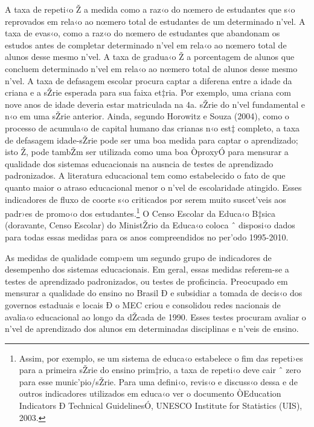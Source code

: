 \documentclass[a4paper, 12pt]{article}
\begin{document}
A taxa de repeti‹o Ž a medida como a raz‹o do nœmero de estudantes que s‹o reprovados em rela‹o ao nœmero total de estudantes de um determinado n’vel. A taxa de evas‹o, como a raz‹o do nœmero de estudantes que abandonam os estudos antes de completar determinado n’vel em rela‹o ao nœmero total de alunos desse mesmo n’vel. A taxa de gradua‹o Ž a porcentagem de alunos que concluem determinado n’vel em rela‹o ao nœmero total de alunos desse mesmo n’vel. A taxa de defasagem escolar procura captar a diferena entre a idade da criana e a sŽrie esperada para sua faixa et‡ria. Por exemplo, uma criana com nove anos de idade deveria estar matriculada na 4a. sŽrie do n’vel fundamental e n‹o em uma sŽrie anterior. Ainda, segundo Horowitz e Souza (2004), como o processo de acumula‹o de capital humano das crianas n‹o est‡ completo, a taxa de defasagem idade-sŽrie pode ser uma boa medida para captar o aprendizado; isto Ž, pode tambŽm ser utilizada como uma boa ÒproxyÓ para mensurar a qualidade dos sistemas educacionais na ausncia de testes de aprendizado padronizados. A literatura educacional tem como estabelecido o fato de que quanto maior o atraso educacional menor o n’vel de escolaridade atingido. Esses indicadores de fluxo de coorte s‹o criticados por serem muito suscet’veis aos padr›es de promo‹o dos estudantes.\footnote{Assim, por exemplo, se um sistema de educa‹o estabelece o fim das repeti›es para a primeira sŽrie do ensino prim‡rio, a taxa de repeti‹o deve cair ˆ zero para esse munic’pio/sŽrie. Para uma defini‹o, revis‹o e discuss‹o dessa e de outros indicadores utilizados em educa‹o ver o documento ÒEducation Indicators Ð Technical GuidelinesÓ, UNESCO Institute for Statistics (UIS), 2003.} O Censo Escolar da Educa‹o B‡sica (doravante, Censo Escolar) do MinistŽrio da Educa‹o coloca ˆ disposi‹o dados para todas essas medidas para os anos compreendidos no per’odo 1995-2010.

As medidas de qualidade comp›em um segundo grupo de indicadores de desempenho dos sistemas educacionais. Em geral, essas medidas referem-se a testes de aprendizado padronizados, ou testes de proficincia. Preocupado em mensurar a qualidade do ensino no Brasil Ð e subsidiar a tomada de decis‹o dos governos estaduais e locais Ð o MEC criou e consolidou redes nacionais de avalia‹o educacional ao longo da dŽcada de 1990. Esses testes procuram avaliar o n’vel de aprendizado dos alunos em determinadas disciplinas e n’veis de ensino.
\end{document}
